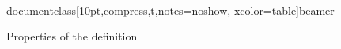\\documentclass[10pt,compress,t,notes=noshow, xcolor=table]{beamer}
\begin{document}
\begin{frame}{Properties of the definition}
\begin{itemize}
\end{itemize}
\end{frame}
\end{document}
